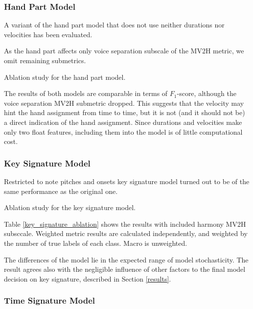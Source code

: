 \subsubsection{Hand Part Model}

A variant of the hand part model that does not use neither durations nor velocities has been evaluated.

As the hand part affects only voice separation subscale of the MV2H metric, we omit remaining submetrics.

\begin{table}[ht!]
\centering

\caption[Ablation study for the hand part model]{Ablation study for the hand part model.}
\label{hand_part_ablation}
\end{table}

The results of both models are comparable in terms of $F_1$-score, although the voice separation MV2H submetric dropped. This suggests that the velocity may hint the hand assignment from time to time, but it is not (and it should not be) a direct indication of the hand assignment. Since durations and velocities make only two float features, including them into the model is of little computational cost.

\subsubsection{Key Signature Model}

Restricted to note pitches and onsets key signature model turned out to be of the same performance as the original one. 

\begin{table}[ht!]
\centering

\caption[Ablation study for the key signature model]{Ablation study for the key signature model.}
\label{key_signature_ablation}
\end{table}

Table \ref{key_signature_ablation} shows the results with included harmony MV2H subsccale. Weighted metric results are calculated independently, and weighted by the number of true labels of each class. Macro is unweighted.

The differences of the model lie in the expected range of model stochasticity. The result agrees also with the negligible influence of other factors to the final model decision on key signature, described in Section \ref{results}.

\subsubsection{Time Signature Model}

